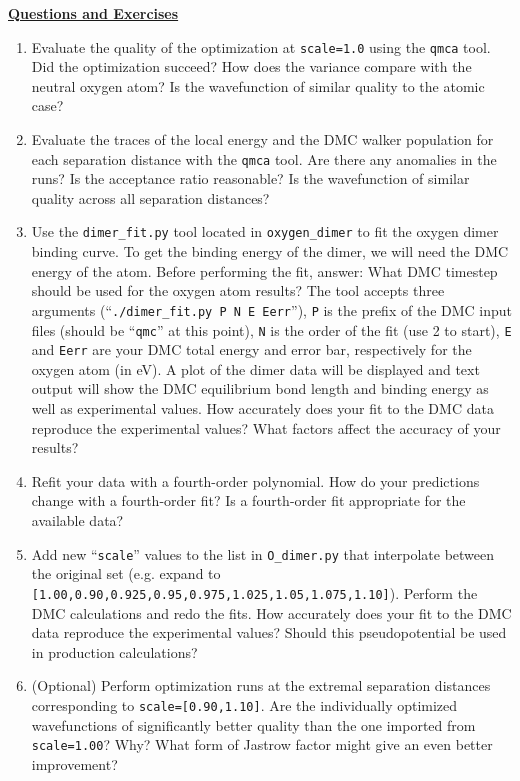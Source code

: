 \vspace{3cm}
\begin{flushleft}
\textbf{\underline{Questions and Exercises}}
\end{flushleft}
\begin{enumerate}
  \item{Evaluate the quality of the optimization at \texttt{scale=1.0} using the \texttt{qmca} tool.  Did the optimization succeed?  How does the variance compare with the neutral oxygen atom?  Is the wavefunction of similar quality to the atomic case?}

  \item{Evaluate the traces of the local energy and the DMC walker population for each separation distance with the \texttt{qmca} tool.  Are there any anomalies in the runs?  Is the acceptance ratio reasonable?  Is the wavefunction of similar quality across all separation distances?}

  \item{Use the \texttt{dimer\_fit.py} tool located in \texttt{oxygen\_dimer} to fit the oxygen dimer binding curve.   To get the binding energy of the dimer, we will need the DMC energy of the atom.  Before performing the fit, answer: What DMC timestep should be used for the oxygen atom results?  The tool accepts three arguments (``\verb|./dimer_fit.py P N E Eerr|''}), \texttt{P} is the prefix of the DMC input files (should be ``\texttt{qmc}'' at this point), \texttt{N} is the order of the fit (use 2 to start), \texttt{E} and \texttt{Eerr} are your DMC total energy and error bar, respectively for the oxygen atom (in eV).  A plot of the dimer data will be displayed and text output will show the DMC equilibrium bond length and binding energy as well as experimental values.  How accurately does your fit to the DMC data reproduce the experimental values?  What factors affect the accuracy of your results? 

  \item{Refit your data with a fourth-order polynomial.  How do your predictions change with a fourth-order fit?  Is a fourth-order fit appropriate for the available data?}
 
  \item{Add new ``\texttt{scale}'' values to the list in \texttt{O\_dimer.py} that interpolate between the original set (e.g. expand to \texttt{[1.00,0.90,0.925,0.95,0.975,1.025,1.05,1.075,1.10]}).  Perform the DMC calculations and redo the fits.  How accurately does your fit to the DMC data reproduce the experimental values?  Should this pseudopotential be used in production calculations?}

  \item{(Optional) Perform optimization runs at the extremal separation distances corresponding to \texttt{scale=[0.90,1.10]}}.  Are the individually optimized wavefunctions of significantly better quality than the one imported from \texttt{scale=1.00}?  Why?  What form of Jastrow factor might give an even better improvement? 
\end{enumerate}




